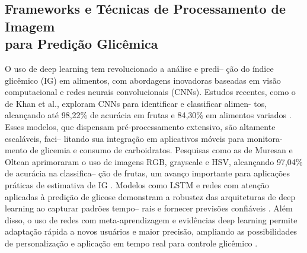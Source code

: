 \documentclass[conference]{IEEEtran}
\begin{document}
\subsection{Frameworks e Técnicas de Processamento de Imagem \\para Predição Glicêmica}
\sloppy
O uso de deep learning tem revolucionado a análise e predi--
ção do índice glicêmico (IG) em alimentos, com abordagens
inovadoras baseadas em visão computacional e redes neurais 
convolucionais (CNNs). Estudos recentes, como o de Khan 
et al., exploram CNNs para identificar e classificar alimen-
tos, alcançando até 98,22\% de acurácia em frutas e 84,30\%
em alimentos variados \cite{b31}. Esses modelos, que dispensam 
pré-processamento extensivo, são altamente escaláveis, faci--
litando sua integração em aplicativos móveis para monitora-
mento de glicemia e consumo de carboidratos. Pesquisas como  
as de Muresan e Oltean aprimoraram o uso de imagens RGB, 
grayscale e HSV, alcançando 97,04\% de acurácia na classifica--
ção de frutas, um avanço importante para aplicações práticas 
de estimativa de IG \cite{b32}. Modelos como LSTM e redes com 
atenção aplicadas à predição de glicose demonstram a robustez 
das arquiteturas de deep learning ao capturar padrões tempo--
rais e fornecer previsões confiáveis \cite{b33}. Além disso, o uso 
de redes com meta-aprendizagem e evidências deep learning 
permite adaptação rápida a novos usuários e maior precisão, 
ampliando as possibilidades de personalização e aplicação em 
tempo real para controle glicêmico \cite{b34}.
\fussy
\end{document}
